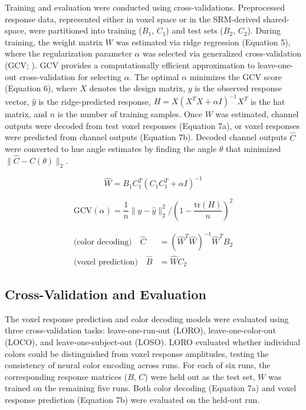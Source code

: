 Training and evaluation were conducted using cross-validations. Preprocessed response data, represented either in voxel space or in the SRM-derived shared-space, were partitioned into training ($B_1$, $C_1$) and test sets ($B_2$, $C_2$). During training, the weight matrix $W$ was estimated via ridge regression (Equation 5), where the regularization parameter $\alpha$ was selected via generalized cross-validation (GCV; ). GCV provides a computationally efficient approximation to leave-one-out cross-validation for selecting $\alpha$. The optimal $\alpha$ minimizes the GCV score (Equation 6), where $X$ denotes the design matrix, $y$ is the observed response vector, $\hat{y}$ is the ridge-predicted response, $H = X(X^T X + \alpha I)^{-1}X^T$ is the hat matrix, and $n$ is the number of training samples. Once $W$ was estimated, channel outputs were decoded from test voxel responses (Equation 7a), or voxel responses were predicted from channel outputs (Equation 7b). Decoded channel outputs $\hat{C}$ were converted to hue angle estimates by finding the angle $\theta$ that minimized $\|\hat{C} - C(\theta)\|_2$.

\begin{equation}
\hat{W} = B_1 C_1^T (C_1 C_1^T + \alpha I)^{-1}
\end{equation}

\begin{equation}
\text{GCV}(\alpha) = \frac{1}{n} \|y - \hat{y}\|_2^2 / \left(1 - \frac{\text{tr}(H)}{n}\right)^2
\end{equation}

\begin{align}
\text{(color decoding)} \quad \hat{C} &= (\hat{W}^T \hat{W})^{-1} \hat{W}^T B_2 \\
\text{(voxel prediction)} \quad \hat{B} &= \hat{W} C_2
\end{align}

\subsection*{Cross-Validation and Evaluation}

The voxel response prediction and color decoding models were evaluated using three cross-validation tasks: leave-one-run-out (LORO), leave-one-color-out (LOCO), and leave-one-subject-out (LOSO). LORO evaluated whether individual colors could be distinguished from voxel response amplitudes, testing the consistency of neural color encoding across runs. For each of six runs, the corresponding response matrices ($B$, $C$) were held out as the test set, $W$ was trained on the remaining five runs. Both color decoding (Equation 7a) and voxel response prediction (Equation 7b) were evaluated on the held-out run.

